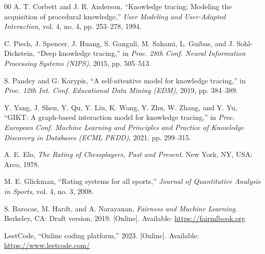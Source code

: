 \documentclass[conference]{IEEEtran}
\begin{document}
\begin{thebibliography}{00}
A. T. Corbett and J. R. Anderson, ``Knowledge tracing: Modeling the acquisition of procedural knowledge,'' \textit{User Modeling and User-Adapted Interaction}, vol. 4, no. 4, pp. 253--278, 1994.

C. Piech, J. Spencer, J. Huang, S. Ganguli, M. Sahami, L. Guibas, and J. Sohl-Dickstein, ``Deep knowledge tracing,'' in \textit{Proc. 28th Conf. Neural Information Processing Systems (NIPS)}, 2015, pp. 505--513.

S. Pandey and G. Karypis, ``A self-attentive model for knowledge tracing,'' in \textit{Proc. 12th Int. Conf. Educational Data Mining (EDM)}, 2019, pp. 384--389.

Y. Yang, J. Shen, Y. Qu, Y. Liu, K. Wang, Y. Zhu, W. Zhang, and Y. Yu, ``GIKT: A graph-based interaction model for knowledge tracing,'' in \textit{Proc. European Conf. Machine Learning and Principles and Practice of Knowledge Discovery in Databases (ECML PKDD)}, 2021, pp. 299--315.

A. E. Elo, \textit{The Rating of Chessplayers, Past and Present}. New York, NY, USA: Arco, 1978.

M. E. Glickman, ``Rating systems for all sports,'' \textit{Journal of Quantitative Analysis in Sports}, vol. 4, no. 3, 2008.

S. Barocas, M. Hardt, and A. Narayanan, \textit{Fairness and Machine Learning}. Berkeley, CA: Draft version, 2019. [Online]. Available: \url{https://fairmlbook.org}

LeetCode, ``Online coding platform,'' 2023. [Online]. Available: \url{https://www.leetcode.com/}

\end{thebibliography}
\end{document}
